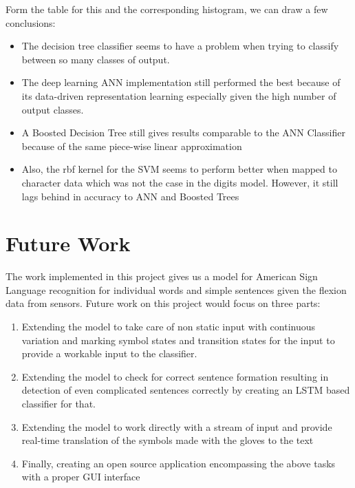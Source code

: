 Form the table for this and the corresponding histogram, we can draw a few conclusions:
\begin{itemize}
\item The decision tree classifier seems to have a problem when trying to classify between so many classes of output.
\item The deep learning ANN implementation still performed the best because of its data-driven representation learning especially given the high number of output classes.
\item A Boosted Decision Tree still gives results comparable to the ANN Classifier because of the same piece-wise linear approximation
\item Also, the rbf kernel for the SVM seems to perform better when mapped to character data which was not the case in the digits model. However, it still lags behind in accuracy to ANN and Boosted Trees
\end{itemize}

\section{Future Work}

The work implemented in this project gives us a model for American Sign Language recognition for individual words and simple sentences given the flexion data from sensors.
Future work on this project would focus on three parts:
\begin{enumerate}
\item Extending the model to take care of non static input with continuous variation and marking symbol states and transition states for the input to provide a workable input to the classifier.
\item Extending the model to check for correct sentence formation resulting in detection of even complicated sentences correctly by creating an LSTM based classifier for that.
\item Extending the model to work directly with a stream of input and provide real-time translation of the symbols made with the gloves to the text
\item Finally, creating an open source application encompassing the above tasks with a proper GUI interface 
\end{enumerate}
